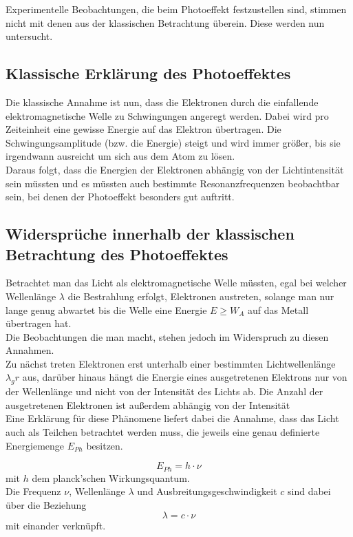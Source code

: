 Experimentelle Beobachtungen, die beim Photoeffekt festzustellen sind, stimmen nicht mit denen aus der klassischen Betrachtung überein. Diese werden nun untersucht.

\subsection{Klassische Erklärung des Photoeffektes}
 Die klassische Annahme ist nun, dass die Elektronen durch die einfallende elektromagnetische Welle zu Schwingungen angeregt werden. Dabei wird pro Zeiteinheit eine gewisse Energie auf das Elektron übertragen. Die Schwingungsamplitude (bzw. die Energie) steigt und wird immer größer, bis sie irgendwann ausreicht um sich aus dem Atom zu lösen.\\
Daraus folgt, dass die Energien der Elektronen abhängig von der Lichtintensität sein müssten und es müssten auch bestimmte Resonanzfrequenzen beobachtbar sein, bei denen der Photoeffekt besonders gut auftritt.

\subsection{Widersprüche innerhalb der klassischen Betrachtung des Photoeffektes}
Betrachtet man das Licht als elektromagnetische Welle müssten, egal bei welcher Wellenlänge $\lambda$ die Bestrahlung erfolgt, Elektronen austreten, solange man nur lange genug abwartet bis die Welle eine Energie $E \geq W_A$ auf das Metall übertragen hat.\\
Die Beobachtungen die man macht, stehen jedoch im Widerspruch zu diesen Annahmen.\\
Zu nächst treten Elektronen erst unterhalb einer bestimmten Lichtwellenlänge $\lambda_gr$ aus, darüber hinaus hängt die Energie eines ausgetretenen Elektrons nur von der Wellenlänge und nicht von der Intensität des Lichts ab. Die Anzahl der ausgetretenen Elektronen ist außerdem abhängig von der Intensität\\

Eine Erklärung für diese Phänomene liefert dabei die Annahme, dass das Licht auch als Teilchen betrachtet werden muss, die jeweils eine genau definierte Energiemenge $E_{Ph}$ besitzen.

\begin{equation}
E_{Ph} = h \cdot \nu
\end{equation}
mit $h$ dem planck'schen Wirkungsquantum.\\
Die Frequenz $\nu$, Wellenlänge $\lambda$ und Ausbreitungsgeschwindigkeit $c$ sind dabei über die Beziehung
\begin{equation}
\lambda = c \cdot \nu
\end{equation}
mit einander verknüpft.\\

